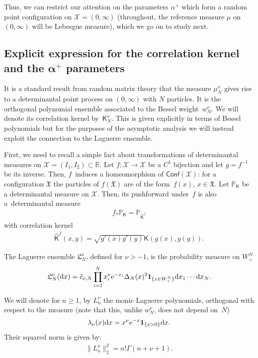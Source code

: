 \documentclass[pdftex]{sigma}
\numberwithin{equation}{section}
\begin{document}
Thus, we can restrict our attention on the parameters $\alpha^+$ which form a random point configuration on $\mathcal{X}=(0,\infty)$ (throughout, the reference measure $\mu$ on $(0,\infty)$ will be Lebesgue measure), which we go on to study next.

\subsection[Explicit expression for the correlation kernel and the $\alpha^+$ parameters]{Explicit expression for the correlation kernel and the $\boldsymbol{\alpha^+}$ parameters}\label{section4.2}

 It is a standard result from random matrix theory that the measure $\mu^{\nu}_N$ gives rise to a determinantal point process on $(0,\infty)$ with $N$ particles. It is the orthogonal polynomial ensemble associated to the Bessel weight~$w_N^{\nu}$. We will denote its correlation kernel by~$\mathsf{K}_N^{\nu}$. This is given explicitly in terms of Bessel polynomials but for the purposes of the asymptotic analysis we will instead exploit the connection to the Laguerre ensemble.

First, we need to recall a simple fact about transformations of determinantal measures on $\mathcal{X}=(I_1,I_2) \subset \mathbb{R}$. Let $f\colon \mathcal{X} \to \mathcal{X}$ be a $C^1$ bijection and let $g=f^{-1}$ be its inverse. Then, $f$~induces a homeomorphism of $\mathsf{Conf}(\mathcal{X})$: for a configuration $\mathfrak{X}$ the particles of $f(\mathfrak{X})$ are of the form~$f(x)$, $x \in \mathfrak{X}$. Let $\mathbb{P}_{\mathsf{K}}$ be a determinantal measure on $\mathcal{X}$. Then, its pushforward under~$f$ is also a~determinantal measure
\begin{gather*}
f_*\mathbb{P}_{\mathsf{K}}=\mathbb{P}_{\hat{\mathsf{K}}^f}
\end{gather*}
with correlation kernel
\begin{gather*}
\hat{\mathsf{K}}^f(x,y)=\sqrt{g'(x)g'(y)}\mathsf{K}(g(x),g(y)).
\end{gather*}

The Laguerre ensemble $\mathfrak{L}_N^{\nu}$, defined for $\nu>-1$, is the probability measure on $W^N_+$
\begin{gather*}
\mathfrak{L}_N^{\nu}({\rm d}x)=\tilde{c}_{\nu,N} \prod_{i=1}^{N}x_i^{\nu}{\rm e}^{-x_i}\Delta_N(x)^2 \textbf{1}_{\{x \in W^N_+\}} {\rm d}x_1\cdots {\rm d}x_N.
\end{gather*}

We will denote for $n\ge 1$, by $L_n^{\nu}$ the monic Laguerre polynomials, orthogonal with respect to the measure (note that this, unlike $w^{\nu}_N$, does not depend on~$N$)
\begin{gather*}
\lambda_\nu(x){\rm d}x=x^{\nu} {\rm e}^{-x}\textbf{1}_{\{x>0\}}{\rm d}x.
\end{gather*}
Their squared norm is given by:
\begin{gather*}
\|L_n^{\nu}\|_2^2=n! \Gamma(n+\nu+1).
\end{gather*}
\end{document}
